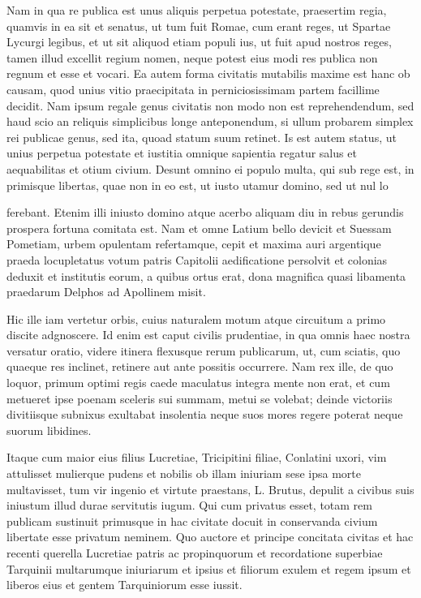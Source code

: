 Nam in qua re publica est unus aliquis perpetua potestate, praesertim regia, quamvis in ea sit et senatus, ut tum fuit Romae, cum erant reges, ut Spartae Lycurgi legibus, et ut sit aliquod etiam populi ius, ut fuit apud nostros reges, tamen illud excellit regium nomen, neque potest eius modi res publica non regnum et esse et vocari. Ea autem forma civitatis mutabilis maxime est hanc ob causam, quod unius vitio praecipitata in perniciosissimam partem facillime decidit. Nam ipsum regale genus civitatis non modo non est reprehendendum, sed haud scio an reliquis simplicibus longe anteponendum, si ullum probarem simplex rei publicae genus, sed ita, quoad statum suum retinet. Is est autem status, ut unius perpetua potestate et iustitia omnique sapientia regatur salus et aequabilitas et otium civium. Desunt omnino ei populo multa, qui sub rege est, in primisque libertas, quae non in eo est, ut iusto utamur domino, sed ut nul lo

 ferebant. Etenim illi iniusto domino atque acerbo aliquam diu in rebus gerundis prospera fortuna comitata est. Nam et omne Latium bello devicit et Suessam Pometiam, urbem opulentam refertamque, cepit et maxima auri argentique praeda locupletatus votum patris Capitolii aedificatione persolvit et colonias deduxit et institutis eorum, a quibus ortus erat, dona magnifica quasi libamenta praedarum Delphos ad Apollinem misit.

 Hic ille iam vertetur orbis, cuius naturalem motum atque circuitum a primo discite adgnoscere. Id enim est caput civilis prudentiae, in qua omnis haec nostra versatur oratio, videre itinera flexusque rerum publicarum, ut, cum sciatis, quo quaeque res inclinet, retinere aut ante possitis occurrere. Nam rex ille, de quo loquor, primum optimi regis caede maculatus integra mente non erat, et cum metueret ipse poenam sceleris sui summam, metui se volebat; deinde victoriis divitiisque subnixus exultabat insolentia neque suos mores regere poterat neque suorum libidines.

 Itaque cum maior eius filius Lucretiae, Tricipitini filiae, Conlatini uxori, vim attulisset mulierque pudens et nobilis ob illam iniuriam sese ipsa morte multavisset, tum vir ingenio et virtute praestans, L. Brutus, depulit a civibus suis iniustum illud durae servitutis iugum. Qui cum privatus esset, totam rem publicam sustinuit primusque in hac civitate docuit in conservanda civium libertate esse privatum neminem. Quo auctore et principe concitata civitas et hac recenti querella Lucretiae patris ac propinquorum et recordatione superbiae Tarquinii multarumque iniuriarum et ipsius et filiorum exulem et regem ipsum et liberos eius et gentem Tarquiniorum esse iussit.

